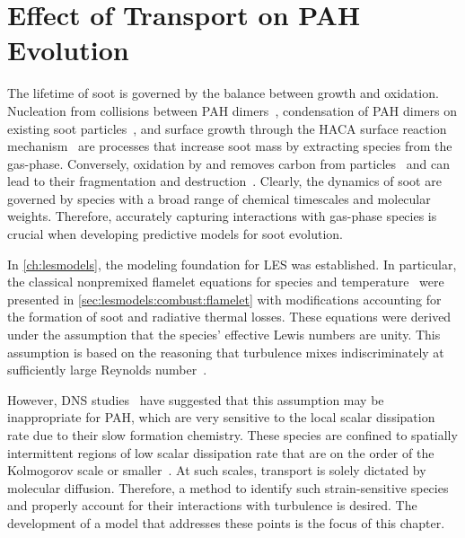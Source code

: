 \chapter{Effect of Transport on PAH Evolution\label{ch:transport}}

The lifetime of soot is governed by the balance between growth and oxidation. Nucleation from collisions between PAH dimers~\cite{blanquart2009,schuetz2002,frenklach1991,wang2011}, condensation of PAH dimers on existing soot particles~\cite{blanquart2009,hmom2009}, and surface growth through the HACA surface reaction mechanism~\cite{frenklach1985,frenklach1991} are processes that increase soot mass by extracting species from the gas-phase. Conversely, oxidation by  and  removes carbon from particles~\cite{stanmore2001,neoh1981,kazakov1995} and can lead to their fragmentation and destruction~\cite{neoh1985,mueller2011}. Clearly, the dynamics of soot are governed by species with a broad range of chemical timescales and molecular weights. Therefore, accurately capturing interactions with gas-phase species is crucial when developing predictive models for soot evolution.

In \cref{ch:lesmodels}, the modeling foundation for LES was established. In particular, the classical nonpremixed flamelet equations for species and temperature~\cite{peters1984} were presented in \cref{sec:lesmodels:combust:flamelet} with modifications accounting for the formation of soot and radiative thermal losses. These equations were derived under the assumption that the species' effective Lewis numbers are unity. This assumption is based on the reasoning that turbulence mixes indiscriminately at sufficiently large Reynolds number~\cite{pitsch19981057}.


However, DNS studies~\cite{bisetti2012,attili2014} have suggested that this assumption may be inappropriate for PAH, which are very sensitive to the local scalar dissipation rate due to their slow formation chemistry. These species are confined to spatially intermittent regions of low scalar dissipation rate that are on the order of the Kolmogorov scale or smaller~\cite{vaishnavi2008}. At such scales, transport is solely dictated by molecular diffusion. Therefore, a method to identify such strain-sensitive species and properly account for their interactions with turbulence is desired. The development of a model that addresses these points is the focus of this chapter.

